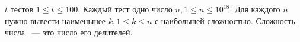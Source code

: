 $t$ тестов $1 \le t \le 100$. Каждый тест одно число $n, 1 \le n \le 10^{18}$.
Для каждого $n$ нужно вывести наименьшее $k, 1 \le k \le n$ с наибольшей сложностью.
Сложность числа ~--- это число его делителей.
